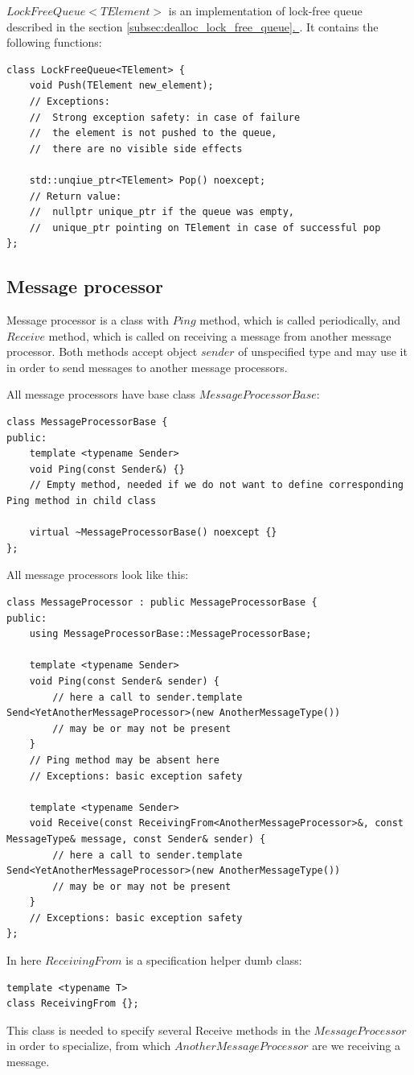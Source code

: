 \documentclass{article}
\newcommand*{\fullref}[1]{\hyperref[{#1}]{\ref*{#1}. \nameref*{#1}}}
\begin{document}
$LockFreeQueue<TElement>$ is an implementation of lock-free queue described in the section \fullref{subsec:dealloc_lock_free_queue}. It contains the following functions:

\begin{lstlisting}
class LockFreeQueue<TElement> {
	void Push(TElement new_element);
	// Exceptions:
	// 	Strong exception safety: in case of failure
	// 	the element is not pushed to the queue,
	// 	there are no visible side effects

	std::unqiue_ptr<TElement> Pop() noexcept;
	// Return value:
	// 	nullptr unique_ptr if the queue was empty,
	// 	unique_ptr pointing on TElement in case of successful pop
};
\end{lstlisting}

\subsection{Message processor}
\label{subsec:message_processor}
Message processor is a class with $Ping$ method, which is called periodically, and $Receive$ method, which is called on receiving a message from another message processor. Both methods accept object $sender$ of unspecified type and may use it in order to send messages to another message processors.

All message processors have base class $MessageProcessorBase$:

\begin{lstlisting}
class MessageProcessorBase {
public:
	template <typename Sender>
	void Ping(const Sender&) {}
	// Empty method, needed if we do not want to define corresponding Ping method in child class

	virtual ~MessageProcessorBase() noexcept {}
};
\end{lstlisting}

All message processors look like this:
\begin{lstlisting}
class MessageProcessor : public MessageProcessorBase {
public:
	using MessageProcessorBase::MessageProcessorBase;

	template <typename Sender>
	void Ping(const Sender& sender) {
		// here a call to sender.template Send<YetAnotherMessageProcessor>(new AnotherMessageType())
		// may be or may not be present
	}
	// Ping method may be absent here
	// Exceptions: basic exception safety

	template <typename Sender>
	void Receive(const ReceivingFrom<AnotherMessageProcessor>&, const MessageType& message, const Sender& sender) {
		// here a call to sender.template Send<YetAnotherMessageProcessor>(new AnotherMessageType())
		// may be or may not be present
	}
	// Exceptions: basic exception safety
};
\end{lstlisting}
In here $ReceivingFrom$ is a specification helper dumb class:
\begin{lstlisting}
template <typename T>
class ReceivingFrom {};
\end{lstlisting}
This class is needed to specify several Receive methods in the $MessageProcessor$ in order to specialize, from which $AnotherMessageProcessor$ are we receiving a message.
\end{document}
